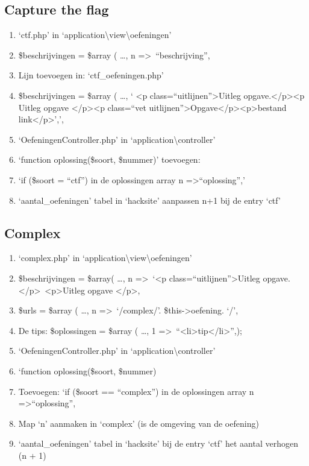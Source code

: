 \subsection{Capture the flag}
\begin{enumerate}
\item `ctf.php' in `application\textbackslash view\textbackslash oefeningen'
\item \$beschrijvingen = \$array ( \ldots , n =\textgreater ~``beschrijving'',
\item Lijn toevoegen in: `ctf\_oefeningen.php'
\item \$beschrijvingen = \$array ( \ldots , ‘ \textless p class=``uitlijnen''\textgreater Uitleg opgave.\textless /p\textgreater \textless p Uitleg opgave \textless /p\textgreater \textless p class=``vet uitlijnen''\textgreater Opgave\textless /p\textgreater \textless p\textgreater  bestand link\textless /p\textgreater ',',
\item `OefeningenController.php' in `application\textbackslash controller'
\item `function oplossing(\$soort, \$nummer)' toevoegen:
\item `if (\$soort = ``ctf'') in de oplossingen array n =\textgreater ``oplossing'','
\item `aantal\_oefeningen' tabel in `hacksite' aanpassen n+1 bij de entry `ctf'
\end{enumerate}

\subsection{Complex}
\begin{enumerate}
\item `complex.php' in `application\textbackslash view\textbackslash oefeningen'
\item \$beschrijvingen = \$array( \ldots , n =\textgreater ~`\textless p class=``uitlijnen''\textgreater Uitleg opgave.\textless /p\textgreater ~\textless p\textgreater Uitleg opgave \textless /p\textgreater,
\item \$urls = \$array ( \ldots , n =\textgreater ~`/complex/'. \$this-\textgreater oefening. `/',
\item De tips: \$oplossingen = \$array ( \ldots , 1 =\textgreater ~``\textless li\textgreater tip\textless /li\textgreater'',);
\item `OefeningenController.php' in `application\textbackslash controller'
\item `function oplossing(\$soort, \$nummer)
\item Toevoegen: `if (\$soort == ``complex'') in de oplossingen array n =\textgreater ``oplossing'',
\item Map `n' aanmaken in `complex' (is de omgeving van de oefening)
\item `aantal\_oefeningen' tabel in `hacksite' bij de entry `ctf' het aantal verhogen (n + 1)
\end{enumerate}

